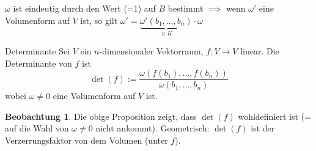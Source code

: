 \documentclass[oneside,fontsize=11pt,paper=a4,BCOR=0mm,DIV=12,automark,headsepline]{scrbook}
\theoremstyle{remark}
\theoremstyle{definition}
\newtheorem{beobachtung}{Beobachtung}
\theoremstyle{definition}
\theoremstyle{remark}
\begin{document}
\(\omega\) ist eindeutig durch den Wert (=1) auf \(B\) bestimmt \(\implies\)  wenn \(\omega'\) eine Volumenform auf \(V\) ist, so gilt \(\omega' = \underbrace{\omega'(b_1,\dots,b_n)}_{\in K}\cdot\omega\)

\begin{definition}{Determinante}{}
	Sei \(V\) ein \(n\)-dimensionaler Vektorraum, \(f: V\to V\) linear. Die Determinante von \(f\) ist
	\[\det(f):= \frac{\omega(f(b_1),\dots,f(b_n))}{\omega(b_1,\dots,b_n)}\]
	wobei \(\omega \neq 0\) eine Volumenform auf \(V\) ist.
\end{definition}

\begin{beobachtung}
	Die obige Proposition zeigt, dass \(\det(f)\) wohldefiniert ist (= auf die Wahl von \(\omega\neq 0\) nicht ankommt). Geometrisch: \(\det(f)\) ist der Verzerrungsfaktor von dem Volumen (unter \(f\)).
\end{beobachtung}
\end{document}
